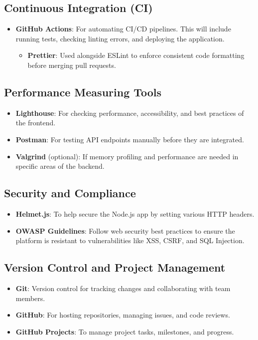 \documentclass{article}
\begin{document}
\subsection{Continuous Integration (CI)}
\begin{itemize}
  \item \textbf{GitHub Actions}: For automating CI/CD pipelines. This will include running tests, checking linting errors, and deploying the application.
  \begin{itemize}
    \item \textbf{Prettier}: Used alongside ESLint to enforce consistent code formatting before merging pull requests.
  \end{itemize}
\end{itemize}

\subsection{Performance Measuring Tools}
\begin{itemize}
  \item \textbf{Lighthouse}: For checking performance, accessibility, and best practices of the frontend.
  \item \textbf{Postman}: For testing API endpoints manually before they are integrated.
  \item \textbf{Valgrind} (optional): If memory profiling and performance are needed in specific areas of the backend.
\end{itemize}

\subsection{Security and Compliance}
\begin{itemize}
  \item \textbf{Helmet.js}: To help secure the Node.js app by setting various HTTP headers.
  \item \textbf{OWASP Guidelines}: Follow web security best practices to ensure the platform is resistant to vulnerabilities like XSS, CSRF, and SQL Injection.
\end{itemize}

\subsection{Version Control and Project Management}
\begin{itemize}
  \item \textbf{Git}: Version control for tracking changes and collaborating with team members.
  \item \textbf{GitHub}: For hosting repositories, managing issues, and code reviews.
  \item \textbf{GitHub Projects}: To manage project tasks, milestones, and progress.
\end{itemize}
\end{document}
